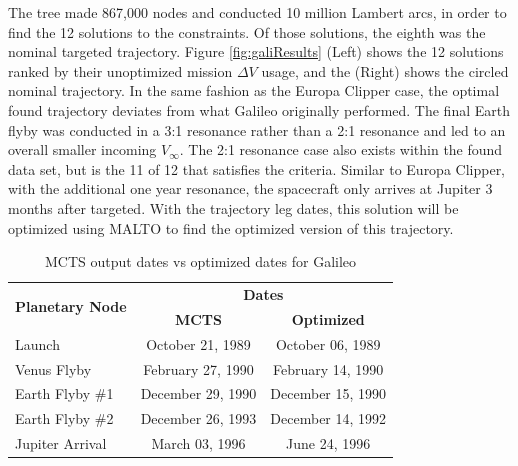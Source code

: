 \documentclass[letterpaper, paper,11pt]{AAS}	%
\begin{document}
The tree made 867,000 nodes and conducted 10 million Lambert arcs, in order to find the 12 solutions to the constraints. Of those solutions, the eighth was the nominal targeted trajectory. Figure \ref*{fig:galiResults} (Left) shows the 12 solutions ranked by their unoptimized mission $\Delta V$ usage, and the (Right) shows the circled nominal trajectory. In the same fashion as the Europa Clipper case, the optimal found trajectory deviates from what Galileo originally performed. The final Earth flyby was conducted in a 3:1 resonance rather than a 2:1 resonance and led to an overall smaller incoming $V_\infty$. The 2:1 resonance case also exists within the found data set, but is the 11 of 12 that satisfies the criteria. Similar to Europa Clipper, with the additional one year resonance, the spacecraft only arrives at Jupiter 3 months after targeted. With the trajectory leg dates, this solution will be optimized using MALTO to find the optimized version of this trajectory.
\begin{table}[htb]
    \begin{center}
        \caption{MCTS output dates vs optimized dates for Galileo}
        \label{table:galiMInputs}
        \begin{tabular}{lcc}
            \toprule
            \multirow{2}{*}{\textbf{Planetary Node}} & \multicolumn{2}{c}{\textbf{Dates}}\\
            \cmidrule{2-3}
            {} & \textbf{MCTS} & \textbf{Optimized}\\
            \midrule
            Launch          & October 21, 1989  & October 06, 1989\\
            Venus Flyby     & February 27, 1990 & February 14, 1990 \\
            Earth Flyby \#1 & December 29, 1990 & December 15, 1990 \\
            Earth Flyby \#2 & December 26, 1993 & December 14, 1992 \\
            Jupiter Arrival & March 03, 1996    & June 24, 1996 \\
            \bottomrule
        \end{tabular}
    \end{center}
\end{table}
\end{document}
